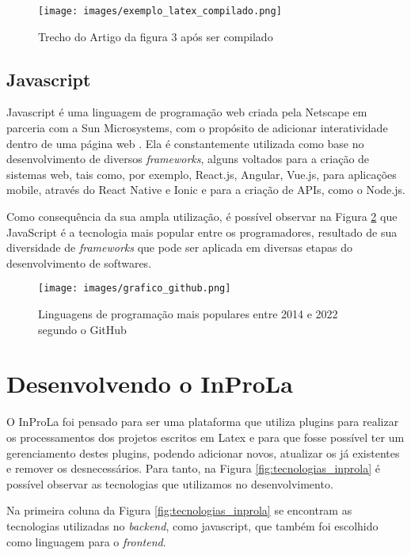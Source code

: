 \documentclass[12pt]{article}
\begin{document}
 \begin{figure}[htb]
\centering
\texttt{[image: images/exemplo\_latex\_compilado.png]}
\caption{Trecho do Artigo da figura 3 após ser compilado}
\label{fig:latex_exemplo_compilado}
\end{figure}

\subsection{Javascript}

Javascript é uma linguagem de programação web criada pela Netscape em parceria com a Sun Microsystems, com o propósito de adicionar interatividade dentro de uma página web \cite{junior2022}. Ela é constantemente utilizada como base no desenvolvimento de diversos \textit{frameworks}, alguns voltados para a criação de sistemas web, tais como, por exemplo, React.js, Angular, Vue.js, para aplicações mobile, através do React Native e Ionic e para a criação de APIs, como o Node.js.

Como consequência da sua ampla utilização, é possível observar na Figura \ref{fig:linguagens_populares}  que JavaScript é a tecnologia mais popular entre os programadores, resultado de sua diversidade de \textit{frameworks} que pode ser aplicada em diversas etapas do desenvolvimento de softwares.

\begin{figure}[ht!]
\centering
\texttt{[image: images/grafico\_github.png]}
\caption{Linguagens de programação mais populares entre 2014 e 2022 segundo o GitHub \cite{inforchannel2023}}
\label{fig:linguagens_populares}
\end{figure}

\section{Desenvolvendo o InProLa}

O InProLa foi pensado para ser uma plataforma que utiliza plugins para realizar os processamentos dos projetos escritos em Latex e para que fosse possível ter um gerenciamento destes plugins, podendo adicionar novos, atualizar os já existentes e remover os desnecessários. Para tanto, na Figura \ref{fig:tecnologias_inprola} é possível observar as tecnologias que utilizamos no desenvolvimento.

Na primeira coluna da Figura \ref{fig:tecnologias_inprola} se encontram as tecnologias utilizadas no \textit{backend}, como javascript, que também foi escolhido como linguagem para o \textit{frontend}.
\end{document}
